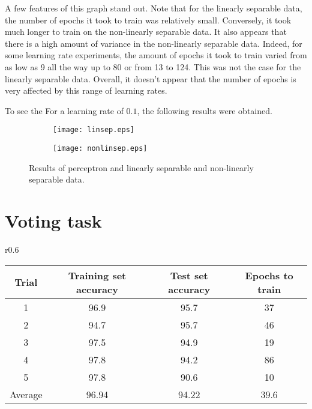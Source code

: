 \documentclass[12pt,letterpaper]{article}
\begin{document}
A few features of this graph stand out. Note that for the linearly separable data, the number of epochs it took to train was relatively small. Conversely, it took much longer to train on the non-linearly separable data. It also appears that there is a high amount of variance in the non-linearly separable data. Indeed, for some learning rate experiments, the amount of epochs it took to train varied from as low as 9 all the way up to 80 or from 13 to 124. This was not the case for the linearly separable data. Overall, it doesn't appear that the number of epochs is very affected by this range of learning rates.


To see the For a learning rate of $0.1$, the following results were obtained.

\begin{center}
\begin{figure}[H]
	\begin{subfigure}[h]{0.5\textwidth}
		\texttt{[image: linsep.eps]} 
	\end{subfigure}
	\begin{subfigure}[h]{0.5\textwidth}
		\texttt{[image: nonlinsep.eps]} 
	\end{subfigure}
\caption{Results of perceptron and linearly separable and non-linearly separable data.}
\end{figure}
\end{center}

\section*{Voting task}

\begin{wrapfigure}{r}{0.6\textwidth}
\begin{center}
\begin{tabular}{cccc}
\toprule
Trial	&	Training set accuracy	&	Test set accuracy 	&	Epochs to train\\
\hline
1	&	96.9	&	95.7	&	37\\
2	&	94.7	&	95.7	&	46\\
3	&	97.5	&	94.9	&	19\\
4	&	97.8	&	94.2	&	86\\
5	&	97.8	&	90.6	&	10\\
\hline
Average	&	96.94	&	94.22	&	39.6\\
\bottomrule
\end{tabular}
\end{center}
\end{wrapfigure}
\end{document}
